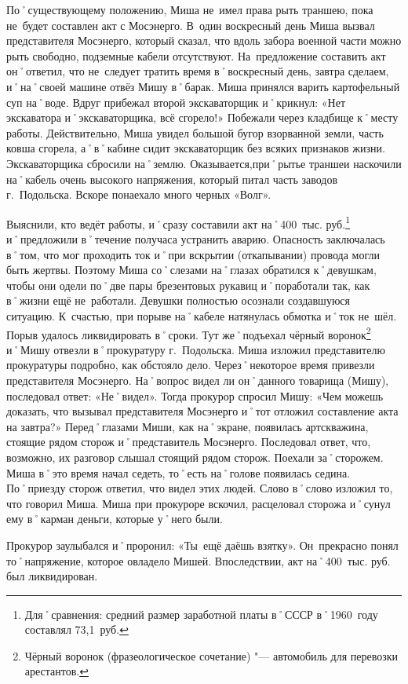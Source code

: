 По˚существующему положению, Миша не~имел права рыть траншею, пока не~будет составлен акт с Мосэнерго. В~один воскресный день Миша вызвал представителя Мосэнерго, который сказал, что вдоль забора военной части можно рыть свободно, подземные кабели отсутствуют. На~предложение составить акт он˚ответил, что не~следует тратить время в˚воскресный день, завтра сделаем, и˚на˚своей машине отвёз Мишу в˚барак. Миша принялся варить картофельный суп на˚воде. Вдруг прибежал второй экскаваторщик и˚крикнул: «Нет экскаватора и˚экскаваторщика, всё сгорело!» Побежали через кладбище к˚месту работы. Действительно, Миша увидел большой бугор взорванной земли, часть ковша сгорела, а˚в˚кабине сидит экскаваторщик без всяких признаков жизни. Экскаваторщика сбросили на˚землю. Оказывается,при˚рытье траншеи наскочили на˚кабель очень высокого напряжения, который питал часть заводов г.~Подольска. Вскоре понаехало много черных «Волг». 

Выяснили, кто ведёт работы, и˚сразу составили акт на˚400~тыс. руб.\footnote{Для˚сравнения: средний размер заработной платы в˚СССР в˚1960~году составлял 73,1~руб.} и˚предложили в˚течение получаса устранить аварию. Опасность заключалась в˚том, что мог проходить ток и˚при вскрытии (откапывании) провода могли быть жертвы. Поэтому Миша со˚слезами на˚глазах обратился к˚девушкам, чтобы они одели по˚две пары брезентовых рукавиц и˚поработали так, как в˚жизни ещё не~работали. Девушки полностью осознали создавшуюся ситуацию. К~счастью, при порыве на˚кабеле натянулась обмотка и˚ток не~шёл. Порыв удалось ликвидировать в˚сроки. Тут же˚подъехал чёрный воронок\footnote{Чёрный воронок (фразеологическое сочетание) "--- автомобиль для перевозки арестантов.} и˚Мишу отвезли в˚прокуратуру г.~Подольска. Миша изложил представителю прокуратуры подробно, как обстояло дело. Через˚некоторое время привезли представителя Мосэнерго. На˚вопрос видел ли он˚данного товарища (Мишу), последовал ответ: «Не˚видел». Тогда прокурор спросил Мишу: «Чем можешь доказать, что вызывал представителя Мосэнерго и˚тот отложил составление акта на завтра?» 
Перед˚глазами Миши, как на˚экране, появилась артскважина, стоящие рядом сторож и˚представитель Мосэнерго. Последовал ответ, что, возможно, их разговор слышал стоящий рядом сторож. Поехали за˚сторожем. Миша в˚это время начал седеть, то˚есть на˚голове появилась седина. По˚приезду сторож ответил, что видел этих людей. Слово в˚слово изложил то, что говорил Миша. Миша при прокуроре вскочил, расцеловал сторожа и˚сунул ему в˚карман деньги, которые у˚него были.

Прокурор заулыбался и˚проронил: «Ты~ещё даёшь взятку». Он~прекрасно понял то˚напряжение, которое овладело Мишей. Впоследствии, акт на˚400~тыс. руб. был ликвидирован.

